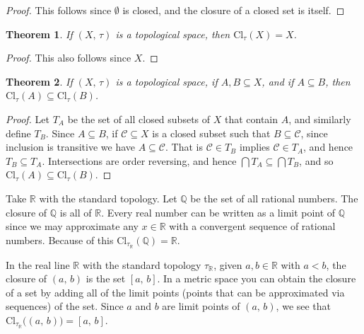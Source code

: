 \documentclass{article}
\theoremstyle{plain}
\newtheorem{theorem}{Theorem}[section]
\theoremstyle{normal}
\newenvironment{example}{%
    \pushQED{\qed}\renewcommand{\qedsymbol}{$\blacksquare$}\examplex%
}{%
    \popQED\endexamplex%
}
\begin{document}
        \begin{proof}
            This follows since $\emptyset$ is closed, and the closure of a
            closed set is itself.
        \end{proof}
        \begin{theorem}
            If $(X,\,\tau)$ is a topological space, then
            $\textrm{Cl}_{\tau}(X)=X$.
        \end{theorem}
        \begin{proof}
            This also follows since $X$.
        \end{proof}
        \begin{theorem}
            If $(X,\,\tau)$ is a topological space, if $A,B\subseteq{X}$, and
            if $A\subseteq{B}$, then
            $\textrm{Cl}_{\tau}(A)\subseteq\textrm{Cl}_{\tau}(B)$.
        \end{theorem}
        \begin{proof}
            Let $T_{A}$ be the set of all closed subsets of $X$ that contain
            $A$, and similarly define $T_{B}$. Since $A\subseteq{B}$, if
            $\mathcal{C}\subseteq{X}$ is a closed subset such that
            $B\subseteq\mathcal{C}$, since inclusion is transitive we have
            $A\subseteq\mathcal{C}$. That is $\mathcal{C}\in{T}_{B}$ implies
            $\mathcal{C}\in{T}_{A}$, and hence
            $T_{B}\subseteq{T}_{A}$. Intersections are order reversing, and
            hence $\bigcap{T}_{A}\subseteq\bigcap{T}_{B}$, and so
            $\textrm{Cl}_{\tau}(A)\subseteq\textrm{Cl}_{\tau}(B)$.
        \end{proof}
        \begin{example}
            Take $\mathbb{R}$ with the standard topology. Let $\mathbb{Q}$
            be the set of all rational numbers. The closure of
            $\mathbb{Q}$ is all of $\mathbb{R}$. Every real number can be
            written as a limit point of $\mathbb{Q}$ since we may approximate
            any $x\in\mathbb{R}$ with a convergent sequence of rational numbers.
            Because of this
            $\textrm{Cl}_{\tau_{\mathbb{R}}}(\mathbb{Q})=\mathbb{R}$.
        \end{example}
        \begin{example}
            In the real line $\mathbb{R}$ with the standard topology
            $\tau_{\mathbb{R}}$, given $a,b\in\mathbb{R}$ with $a<b$, the
            closure of $(a,\,b)$ is the set $[a,\,b]$. In a metric space
            you can obtain the closure of a set by adding all of the
            limit points (points that can be approximated via sequences) of
            the set. Since $a$ and $b$ are limit points of $(a,\,b)$, we
            see that $\textrm{Cl}_{\tau_{\mathbb{R}}}\big((a,\,b)\big)=[a,\,b]$.
        \end{example}
\end{document}

